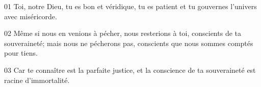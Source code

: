 01 Toi, notre Dieu, tu es bon et véridique, tu es patient et tu gouvernes l’univers avec miséricorde.

02 Même si nous en venions à pécher, nous resterions à toi, conscients de ta souveraineté; mais nous ne pécherons pas, conscients que nous sommes comptés pour tiens.

03 Car te connaître est la parfaite justice, et la conscience de ta souveraineté est racine d’immortalité.
